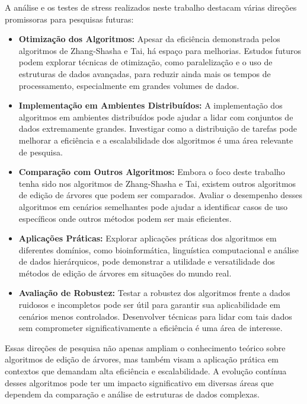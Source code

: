 \documentclass[12pt]{article}
\begin{document}
A análise e os testes de stress realizados neste trabalho destacam várias direções promissoras para pesquisas futuras:

\begin{itemize}
    \item \textbf{Otimização dos Algoritmos:} Apesar da eficiência demonstrada pelos algoritmos de Zhang-Shasha e Tai, há espaço para melhorias. Estudos futuros podem explorar técnicas de otimização, como paralelização e o uso de estruturas de dados avançadas, para reduzir ainda mais os tempos de processamento, especialmente em grandes volumes de dados.
    
    \item \textbf{Implementação em Ambientes Distribuídos:} A implementação dos algoritmos em ambientes distribuídos pode ajudar a lidar com conjuntos de dados extremamente grandes. Investigar como a distribuição de tarefas pode melhorar a eficiência e a escalabilidade dos algoritmos é uma área relevante de pesquisa.
    
    
    \item \textbf{Comparação com Outros Algoritmos:} Embora o foco deste trabalho tenha sido nos algoritmos de Zhang-Shasha e Tai, existem outros algoritmos de edição de árvores que podem ser comparados. Avaliar o desempenho desses algoritmos em cenários semelhantes pode ajudar a identificar casos de uso específicos onde outros métodos podem ser mais eficientes.
    
    \item \textbf{Aplicações Práticas:} Explorar aplicações práticas dos algoritmos em diferentes domínios, como bioinformática, linguística computacional e análise de dados hierárquicos, pode demonstrar a utilidade e versatilidade dos métodos de edição de árvores em situações do mundo real.
    
    \item \textbf{Avaliação de Robustez:} Testar a robustez dos algoritmos frente a dados ruidosos e incompletos pode ser útil para garantir sua aplicabilidade em cenários menos controlados. Desenvolver técnicas para lidar com tais dados sem comprometer significativamente a eficiência é uma área de interesse.
\end{itemize}

Essas direções de pesquisa não apenas ampliam o conhecimento teórico sobre algoritmos de edição de árvores, mas também visam a aplicação prática em contextos que demandam alta eficiência e escalabilidade. A evolução contínua desses algoritmos pode ter um impacto significativo em diversas áreas que dependem da comparação e análise de estruturas de dados complexas.
\end{document}
